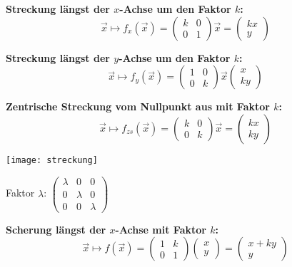 
\textbf{Streckung längst der $x$-Achse um den Faktor $k$:}
\[\vec{x} \mapsto f_x(\vec{x}) = \left(
\begin{array}{cc}
    k & 0 \\
    0 & 1
\end{array}
\right) \vec{x} = \left(
\begin{array}{c}
    kx \\ y
\end{array}
\right)\]

\textbf{Streckung längst der $y$-Achse um den Faktor $k$:}
\[\vec{x} \mapsto f_y(\vec{x}) = \left(
\begin{array}{cc}
    1 & 0 \\
    0 & k
\end{array}
\right) \vec{x} \left(
\begin{array}{c}
    x \\ ky
\end{array}
\right)\]

\textbf{Zentrische Streckung vom Nullpunkt aus mit Faktor $k$:}
\[\vec{x} \mapsto f_{zs}(\vec{x}) = \left(
\begin{array}{cc}
    k & 0 \\
    0 & k
\end{array}
\right) \vec{x} = \left(
\begin{array}{c}
    kx \\ ky
\end{array}
\right)\]

\begin{center}
    \texttt{[image: streckung]}
\end{center}

Faktor $\lambda$: $\left(
\begin{array}{ccc}
    \lambda & 0       & 0       \\
    0       & \lambda & 0       \\
    0       & 0       & \lambda
\end{array}
\right)$


\textbf{Scherung längst der $x$-Achse mit Faktor $k$:}
\[\vec{x} \mapsto f(\vec{x}) = \left(
\begin{array}{cc}
    1 & k \\ 0 & 1
\end{array}
\right) \left(
\begin{array}{c}
    x \\ y
\end{array}
\right) = \left(
\begin{array}{c}
    x + ky \\ y
\end{array}
\right)\]

